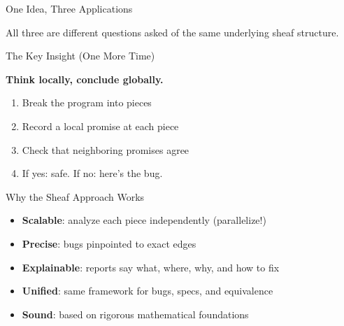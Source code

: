 \documentclass[aspectratio=169,10pt]{beamer}
\begin{document}
\begin{frame}{One Idea, Three Applications}
\begin{center}
\end{center}
\vspace{0.3em}
All three are different questions asked of the same underlying sheaf structure.
\end{frame}

\begin{frame}{The Key Insight (One More Time)}
\begin{center}
\Large
\textbf{Think locally, conclude globally.}
\end{center}
\vspace{0.5em}
\normalsize
\begin{enumerate}
  \item Break the program into pieces
  \item Record a local promise at each piece
  \item Check that neighboring promises agree
  \item If yes: safe. If no: here's the bug.
\end{enumerate}
\end{frame}

\begin{frame}{Why the Sheaf Approach Works}
\begin{itemize}
  \item \textbf{Scalable}: analyze each piece independently (parallelize!)
  \item \textbf{Precise}: bugs pinpointed to exact edges
  \item \textbf{Explainable}: reports say what, where, why, and how to fix
  \item \textbf{Unified}: same framework for bugs, specs, and equivalence
  \item \textbf{Sound}: based on rigorous mathematical foundations
\end{itemize}
\end{frame}
\end{document}
